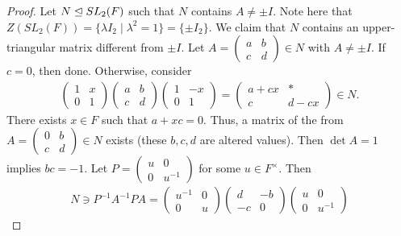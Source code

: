 \begin{proof}
    Let $N \trianglelefteq SL_{2}(F)$ such that $N$ contains $A \neq \pm I$. Note here that $Z(SL_{2}(F)) = \{\lambda I_{2} \mid \lambda^{2} = 1\} = \{\pm I_{2}\}$. We claim that $N$ contains an upper-triangular matrix different from $\pm I$. Let $A = \begin{pmatrix}
        a & b \\ c & d
    \end{pmatrix} \in N$ with $A \neq \pm I$. If $c = 0$, then done. Otherwise, consider
    \begin{align}
        \begin{pmatrix}
            1 & x \\ 0 & 1
        \end{pmatrix} \begin{pmatrix}
            a & b \\ c & d
        \end{pmatrix}
        \begin{pmatrix}
            1 & -x \\ 0 & 1
        \end{pmatrix} = \begin{pmatrix}
            a + cx & \ast \\ c & d - cx
        \end{pmatrix} \in N.
    \end{align}
    There exists $x \in F$ such that $a + xc = 0$. Thus, a matrix of the from $A = \begin{pmatrix}
        0 & b \\ c & d
    \end{pmatrix} \in N$ exists (these $b,c,d$ are altered values). Then $\det A = 1$ implies $bc = -1$. Let $P = \begin{pmatrix}
        u & 0 \\ 0 & u^{-1}
    \end{pmatrix}$ for some $u \in F^{\times}$. Then
    \begin{align}
        N \ni P^{-1}A^{-1} P A = \begin{pmatrix}
            u^{-1} & 0 \\ 0 & u
        \end{pmatrix} \begin{pmatrix}
            d & -b \\ -c & 0
        \end{pmatrix} \begin{pmatrix}
            u & 0 \\ 0 & u^{-1}

\end{pmatrix}
\end{align}
\end{proof}
